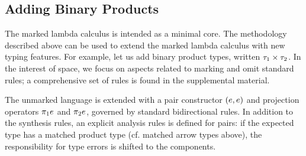 \subsection{Adding Binary Products}
\label{sec:calculus-products}

The marked lambda calculus is intended as a minimal core. The methodology described above can be used to extend the marked lambda calculus with new typing features. For example, let us add binary product types, written $\tau_1 \times \tau_2$. In the interest of space, we focus on
aspects related to marking and omit standard rules; a comprehensive set of rules is found in the supplemental material.


The unmarked language is extended with a pair constructor $(e, e)$ and projection
operators $\pi_1 e$ and $\pi_2 e$, governed by standard bidirectional rules. In addition
to the synthesis rules, an explicit analysis rules is defined for pairs: if the expected type has a matched product type (cf. matched arrow types above), the responsibility for type errors is shifted to the components.

